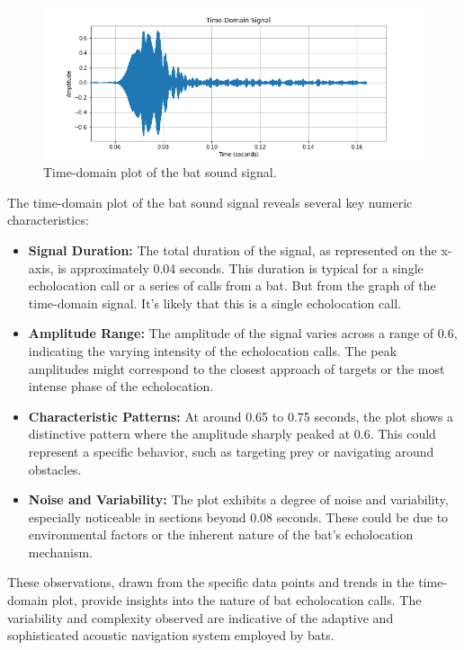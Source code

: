 \documentclass[12pt]{article}
\begin{document}
\begin{figure}[h]
\centering
\includegraphics[width=1.0\textwidth]{time_domain_signal_plot.png}
\caption{Time-domain plot of the bat sound signal.}
\end{figure}

The time-domain plot of the bat sound signal reveals several key numeric characteristics:

\begin{itemize}
    \item \textbf{Signal Duration:} The total duration of the signal, as represented on the x-axis, is approximately 0.04 seconds. This duration is typical for a single echolocation call or a series of calls from a bat. But from the graph of the time-domain signal. It's likely that this is a single echolocation call.

    \item \textbf{Amplitude Range:} The amplitude of the signal varies across a range of 0.6, indicating the varying intensity of the echolocation calls. The peak amplitudes might correspond to the closest approach of targets or the most intense phase of the echolocation.

    \item \textbf{Characteristic Patterns:} At around 0.65 to 0.75 seconds, the plot shows a distinctive pattern where the amplitude sharply peaked at 0.6. This could represent a specific behavior, such as targeting prey or navigating around obstacles.

    \item \textbf{Noise and Variability:} The plot exhibits a degree of noise and variability, especially noticeable in sections beyond 0.08 seconds. These could be due to environmental factors or the inherent nature of the bat's echolocation mechanism.

\end{itemize}

These observations, drawn from the specific data points and trends in the time-domain plot, provide insights into the nature of bat echolocation calls. The variability and complexity observed are indicative of the adaptive and sophisticated acoustic navigation system employed by bats.
\end{document}
